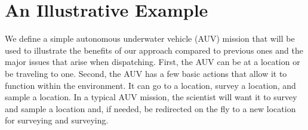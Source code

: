 \section{An Illustrative Example} 
\label{sec:example}

We define a simple autonomous underwater vehicle (AUV) mission that will be used to illustrate the
benefits of our approach compared to previous ones and the major
issues that arise when dispatching. First, the AUV can be at a
location or be traveling to one. Second, the AUV has a few basic
actions that allow it to function within the environment.  It can go
to a location, survey a location, and sample a location. In a typical
AUV mission, the scientist will want it to survey and sample a
location and, if needed, be redirected on the fly to a new location for
surveying and surveying.

